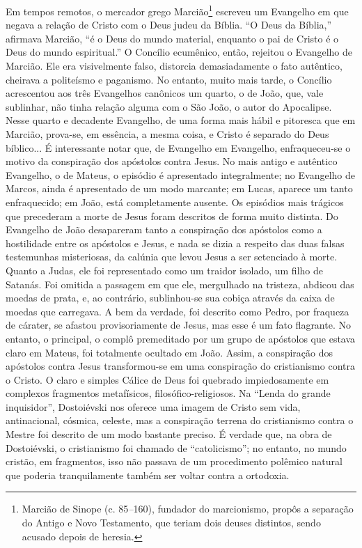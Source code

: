 Em tempos remotos, o mercador grego Marcião\footnote{Marcião de Sinope
  (c. 85\emph{--}160), fundador do marcionismo, propôs a separação do
  Antigo e Novo Testamento, que teriam dois deuses distintos, sendo
  acusado depois de heresia.} escreveu um Evangelho em que negava a
relação de Cristo com o Deus judeu da Bíblia. ``O Deus da Bíblia,''
afirmava Marcião, ``é o Deus do mundo material, enquanto o pai de Cristo
é o Deus do mundo espiritual.'' O Concílio ecumênico, então, rejeitou o
Evangelho de Marcião. Ele era visivelmente falso, distorcia
demasiadamente o fato autêntico, cheirava a politeísmo e paganismo. No
entanto, muito mais tarde, o Concílio acrescentou aos três Evangelhos
canônicos um quarto, o de João, que, vale sublinhar, não tinha relação
alguma com o São João, o autor do Apocalipse. Nesse quarto e decadente
Evangelho, de uma forma mais hábil e pitoresca que em Marcião, prova-se,
em essência, a mesma coisa, e Cristo é separado do Deus bíblico... É
interessante notar que, de Evangelho em Evangelho, enfraqueceu-se o
motivo da conspiração dos apóstolos contra Jesus. No mais antigo e
autêntico Evangelho, o de Mateus, o episódio é apresentado
integralmente; no Evangelho de Marcos, ainda é apresentado de um modo
marcante; em Lucas, aparece um tanto enfraquecido; em João, está
completamente ausente. Os episódios mais trágicos que precederam a morte
de Jesus foram descritos de forma muito distinta. Do Evangelho de João
desapareram tanto a conspiração dos apóstolos como a hostilidade entre
os apóstolos e Jesus, e nada se dizia a respeito das duas falsas
testemunhas misteriosas, da calúnia que levou Jesus a ser setenciado à
morte. Quanto a Judas, ele foi representado como um traidor isolado, um
filho de Satanás. Foi omitida a passagem em que ele, mergulhado na
tristeza, abdicou das moedas de prata, e, ao contrário, sublinhou-se sua
cobiça através da caixa de moedas que carregava. A bem da verdade, foi
descrito como Pedro, por fraqueza de cárater, se afastou provisoriamente
de Jesus, mas esse é um fato flagrante. No entanto, o principal, o
complô premeditado por um grupo de apóstolos que estava claro em Mateus,
foi totalmente ocultado em João. Assim, a conspiração dos apóstolos
contra Jesus transformou-se em uma conspiração do cristianismo contra o
Cristo. O claro e simples Cálice de Deus foi quebrado impiedosamente em
complexos fragmentos metafísicos, filosófico-religiosos. Na ``Lenda do
grande inquisidor'', Dostoiévski nos oferece uma imagem de Cristo sem
vida, antinacional, cósmica, celeste, mas a conspiração terrena do
cristianismo contra o Mestre foi descrito de um modo bastante preciso. É
verdade que, na obra de Dostoiévski, o cristianismo foi chamado de
``catolicismo''; no entanto, no mundo cristão, em fragmentos, isso não
passava de um procedimento polêmico natural que poderia tranquilamente
também ser voltar contra a ortodoxia.

